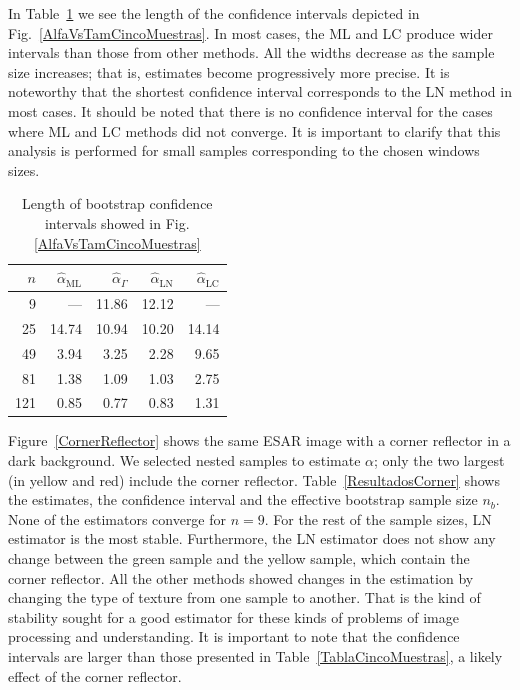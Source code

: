 \documentclass[twocolumn]{svjour3}
\begin{document}
	In Table~\ref{tab:LongIC} we see the length of the confidence intervals depicted in Fig.~\ref{AlfaVsTamCincoMuestras}.
	In most cases, the ML and LC produce wider intervals than those from other methods. 
	All the widths decrease as the sample size increases; that is, estimates become progressively more precise. 
	It is noteworthy that the shortest confidence interval corresponds to the LN method in most cases. 
	It should be noted that there is no confidence interval for the cases where ML and LC methods did not converge.
	It is important to clarify that this analysis is performed for small samples corresponding to the chosen windows sizes. 
	
	\begin{table}[htb]
		\centering
		\caption{\label{tab:LongIC}Length of bootstrap confidence intervals showed in Fig.\ref{AlfaVsTamCincoMuestras}}
		\begin{tabular}{*5{r}}
			\toprule 
			$n$     &  $\widehat{\alpha}_{\text{{ML}}}$    &  $\widehat{\alpha}_{\Gamma}$  &  $\widehat{\alpha}_{\text{{LN}}}$ &  $\widehat{\alpha}_{\text{{LC}}}$ \\
			\midrule
			9     &    ---  & 11.86 & 12.12 & --- \\
			25    & 14.74 & 10.94 & 10.20 & 14.14 \\
			49    & 3.94  & 3.25  & 2.28  & 9.65 \\
			81    & 1.38  & 1.09  & 1.03  & 2.75 \\
			121   & 0.85  & 0.77  & 0.83  & 1.31 \\
			\bottomrule
		\end{tabular}
	\end{table}%
	

	Figure~\ref{CornerReflector} shows the same ESAR image with a corner reflector in a dark background. 
	We selected nested samples to estimate $\alpha$; only the two largest (in yellow and red) include the corner reflector.
	Table~\ref{ResultadosCorner} shows the estimates, the confidence interval and the effective bootstrap sample size $n_b$.
	None of the estimators converge for $n=9$. 
	For the rest of the sample sizes, LN estimator is the most stable. 
	Furthermore, the LN estimator does not show any change between the green sample and the yellow sample, which contain the corner reflector. 
	All the other methods showed changes in the estimation by changing the type of texture from one sample to another. 
	That is the kind of stability sought for a good estimator for these kinds of problems of image processing and understanding. 
	It is important to note that the confidence intervals are larger than those presented in Table~\ref{TablaCincoMuestras}, a likely effect of the corner reflector.
	
\end{document}
